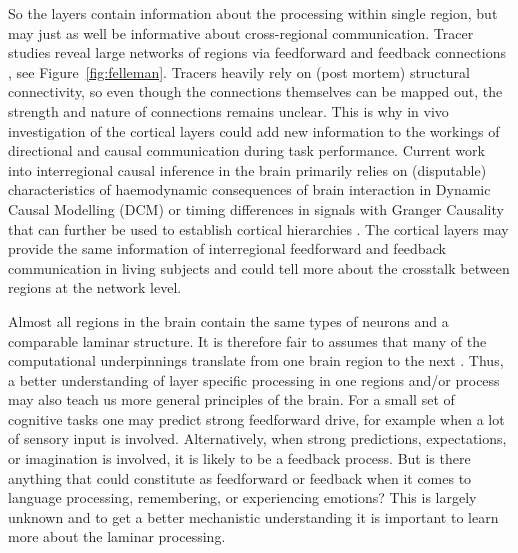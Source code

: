 So the layers contain information about the processing within single region, but may just as well be informative about cross-regional communication. Tracer studies reveal large networks of regions via feedforward and feedback connections \cite{Felleman1991}, see Figure~\ref{fig:felleman}. Tracers heavily rely on (post mortem) structural connectivity, so even though the connections themselves can be mapped out, the strength and nature of connections remains unclear. This is why in vivo investigation of the cortical layers could add new information to the workings of directional and causal communication during task performance. Current work into interregional causal inference in the brain primarily relies on (disputable) characteristics of haemodynamic consequences of brain interaction in Dynamic Causal Modelling (DCM) \cite{Friston2009} or timing differences in signals with Granger Causality \cite{Aalen2007} that can further be used to establish cortical hierarchies \cite{Michalareas2016}. The cortical layers may provide the same information of interregional feedforward and feedback communication in living subjects and could tell more about the crosstalk between regions at the network level.


Almost all regions in the brain contain the same types of neurons and a comparable laminar structure. It is therefore fair to assumes that many of the computational underpinnings translate from one brain region to the next \cite{Buonomano1998}. Thus, a better understanding of layer specific processing in one regions and/or process may also teach us more general principles of the brain. For a small set of cognitive tasks one may predict strong feedforward drive, for example when a lot of sensory input is involved. Alternatively, when strong predictions, expectations, or imagination is involved, it is likely to be a feedback process. But is there anything that could constitute as feedforward or feedback when it comes to language processing, remembering, or experiencing emotions? This is largely unknown and to get a better mechanistic understanding it is important to learn more about the laminar processing.

